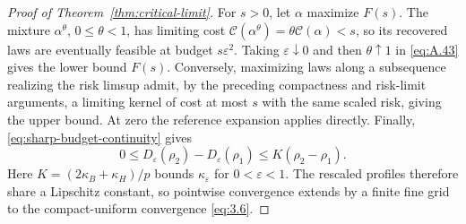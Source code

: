 \begin{proof}[Proof of Theorem~\ref{thm:critical-limit}]
For \(s>0\), let \(\alpha\) maximize \(F(s)\). The mixture \(\alpha^\theta\), \(0\le\theta<1\), has limiting cost \(\mathcal C(\alpha^\theta)=\theta\mathcal C(\alpha)<s\), so its recovered laws are eventually feasible at budget \(s\varepsilon^2\). Taking \(\varepsilon\downarrow0\) and then \(\theta\uparrow1\) in \eqref{eq:A.43} gives the lower bound \(F(s)\). Conversely, maximizing laws along a subsequence realizing the risk limsup admit, by the preceding compactness and risk-limit arguments, a limiting kernel of cost at most \(s\) with the same scaled risk, giving the upper bound. At zero the reference expansion applies directly. Finally, \eqref{eq:sharp-budget-continuity} gives
\begin{equation}
0\le D_\varepsilon(\rho_2)-D_\varepsilon(\rho_1)\le K(\rho_2-\rho_1).
\tag{A.48}\label{eq:A.48}
\end{equation}
Here \(K=(2\kappa_B+\kappa_H)/p\) bounds \(\kappa_\varepsilon\) for \(0<\varepsilon<1\). The rescaled profiles therefore share a Lipschitz constant, so pointwise convergence extends by a finite fine grid to the compact-uniform convergence \eqref{eq:3.6}.
\end{proof}
